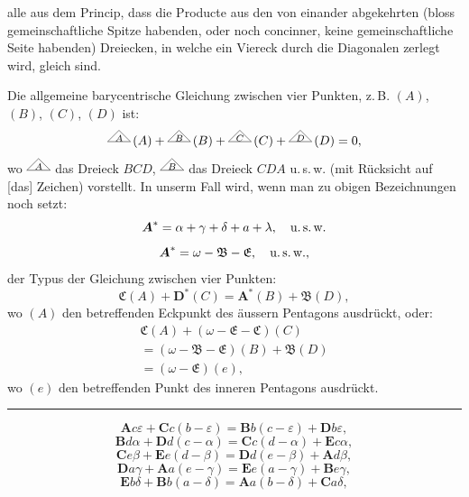 alle aus dem Princip, dass die Producte aus den von einander abgekehrten (bloss
gemeinschaftliche Spitze habenden, oder noch concinner, keine gemeinschaftliche Seite
habenden) Dreiecken, in welche ein Viereck durch die Diagonalen zerlegt wird, gleich sind.

Die allgemeine barycentrische Gleichung zwischen vier Punkten, z.\,B. $(A)$, $(B)$, $(C)$,
$(D)$ ist:
\[
\TriLetter{A}\,(A)+\TriLetter{B}\,(B)+\TriLetter{C}\,(C)+\TriLetter{D}\,(D)=0,
\]
wo $\TriLetter{A}$ das Dreieck $BCD$, $\TriLetter{B}$ das Dreieck $CDA$
u.\,s.\,w. (mit Rücksicht auf [das] Zeichen) vorstellt. In unserm Fall wird, wenn man zu
obigen Bezeichnungen noch setzt:
\[
\boldsymbol{A}^{*}=\alpha+\gamma+\delta+a+\lambda, \quad \text{u.\,s.\,w.}
\]
\[
\boldsymbol{A}^{*}=\omega-\mathfrak{B}-\mathfrak{E}, \quad \text{u.\,s.\,w.},
\]
der Typus der Gleichung zwischen vier Punkten:
\[
\mathfrak{C}(A)+\boldsymbol{D}^{*}(C)=\boldsymbol{A}^{*}(B)+\mathfrak{B}(D),
\]
wo $(A)$ den betreffenden Eckpunkt des äussern Pentagons ausdrückt, oder:
\[
\begin{gathered}\mathfrak{C}(A)+(\omega-\mathfrak{E}-\mathfrak{C})(C)\\=(\omega-\mathfrak{B}-\mathfrak{E})(B)+\mathfrak{B}(D)\\=(\omega-\mathfrak{E})(e),\end{gathered}
\]
wo $(e)$ den betreffenden Punkt des inneren Pentagons ausdrückt.

\begin{center}\rule{3cm}{.4pt}\end{center}

\begin{center}\resizebox{7cm}{!}{}\end{center}

\[
\boldsymbol{A}c\varepsilon+\boldsymbol{C}c(b-\varepsilon)=\boldsymbol{B}b(c-\varepsilon)+\boldsymbol{D}b\varepsilon,
\]
\[
\boldsymbol{B}d\alpha+\boldsymbol{D}d(c-\alpha)=\boldsymbol{C}c(d-\alpha)+\boldsymbol{E}c\alpha,
\]
\[
\boldsymbol{C}e\beta+\boldsymbol{E}e(d-\beta)=\boldsymbol{D}d(e-\beta)+\boldsymbol{A}d\beta,
\]
\[
\boldsymbol{D}a\gamma+\boldsymbol{A}a(e-\gamma)=\boldsymbol{E}e(a-\gamma)+\boldsymbol{B}e\gamma,
\]
\[
\boldsymbol{E}b\delta+\boldsymbol{B}b(a-\delta)=\boldsymbol{A}a(b-\delta)+\boldsymbol{C}a\delta,
\]
